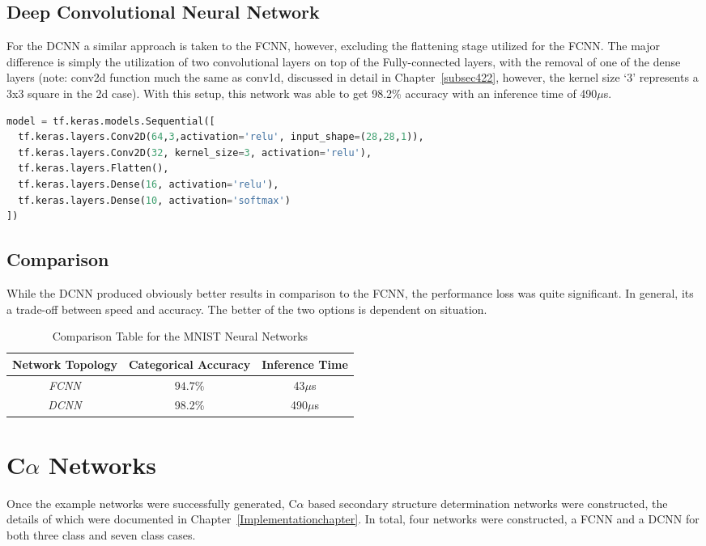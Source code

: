 \documentclass[12pt,letterpaper,oneside,reqno]{book}
\theoremstyle{plain}
\theoremstyle{definition}
\theoremstyle{plain}
\theoremstyle{remark}
\theoremstyle{plain}
\theoremstyle{definition}
\theoremstyle{plain}
\begin{document}
\subsection{Deep Convolutional Neural Network}
For the DCNN a similar approach is taken to the FCNN, however, excluding the flattening stage utilized for the FCNN. The major difference is simply the utilization of two convolutional layers on top of the Fully-connected layers, with the removal of one of the dense layers (note: conv2d function much the same as conv1d, discussed in detail in Chapter~\ref{subsec422}, however, the kernel size `3' represents a 3x3 square in the 2d case). With this setup, this network was able to get 98.2\% accuracy with an inference time of 490$\mu$s.
\begin{lstlisting}[language=Python, caption={DCNN Model for MNIST Dataset}, label=lst:dcnn_mnist, frame=single]
model = tf.keras.models.Sequential([
  tf.keras.layers.Conv2D(64,3,activation='relu', input_shape=(28,28,1)),
  tf.keras.layers.Conv2D(32, kernel_size=3, activation='relu'),
  tf.keras.layers.Flatten(),
  tf.keras.layers.Dense(16, activation='relu'),
  tf.keras.layers.Dense(10, activation='softmax')
])
\end{lstlisting}
\subsection{Comparison}
While the DCNN produced obviously better results in comparison to the FCNN, the performance loss was quite significant. In general, its a trade-off between speed and accuracy. The better of the two options is dependent on situation.
\begin{table}[H]
\centering
		\begin{tabular}{|c|c|c|}
				\hline
			    \textbf{Network Topology} & \textbf{Categorical Accuracy} & \textbf{Inference Time} \\
				\hline
				\textit{FCNN} & $94.7\%$ & 43$\mu$s \\
				\hline
				\textit{DCNN} & 98.2\% & 490$\mu$s \\
				\hline
		\end{tabular}
		\caption{Comparison Table for the MNIST Neural Networks}
		\label{tab:mnistcompare}
\end{table}
\section{C$\alpha$ Networks}
Once the example networks were successfully generated, C$\alpha$ based secondary structure determination networks were constructed, the details of which were documented in Chapter~\ref{Implementationchapter}. In total, four networks were constructed, a FCNN and a DCNN for both three class and seven class cases.
\end{document}
